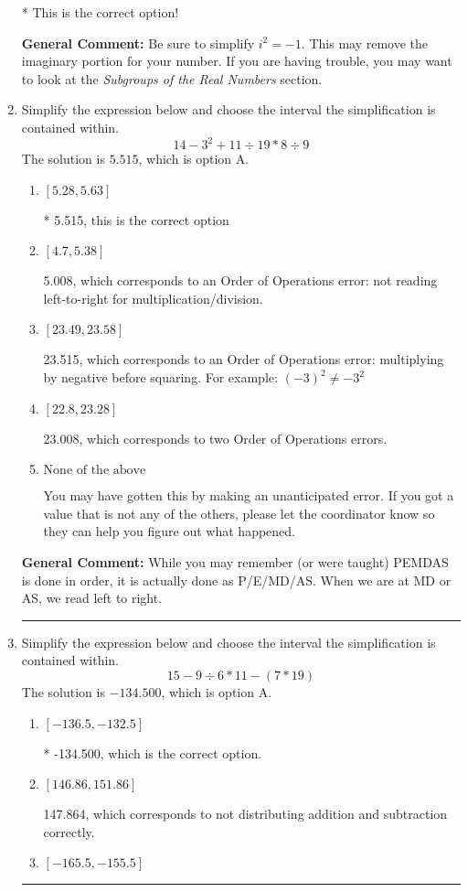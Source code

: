 \documentclass{extbook}[14pt]
\newcommand{\litem}[1]{\item #1

\rule{\textwidth}{0.4pt}}
\begin{document}
\begin{enumerate}
{\begin{enumerate}[label=\Alph*.]
* This is the correct option!
\end{enumerate}

\textbf{General Comment:} Be sure to simplify $i^2 = -1$. This may remove the imaginary portion for your number. If you are having trouble, you may want to look at the \textit{Subgroups of the Real Numbers} section.
}
\litem{
Simplify the expression below and choose the interval the simplification is contained within.
\[ 14 - 3^2 + 11 \div 19 * 8 \div 9 \]The solution is \( 5.515 \), which is option A.\begin{enumerate}[label=\Alph*.]
\item \( [5.28, 5.63] \)

* 5.515, this is the correct option
\item \( [4.7, 5.38] \)

 5.008, which corresponds to an Order of Operations error: not reading left-to-right for multiplication/division.
\item \( [23.49, 23.58] \)

 23.515, which corresponds to an Order of Operations error: multiplying by negative before squaring. For example: $(-3)^2 \neq -3^2$
\item \( [22.8, 23.28] \)

 23.008, which corresponds to two Order of Operations errors.
\item \( \text{None of the above} \)

 You may have gotten this by making an unanticipated error. If you got a value that is not any of the others, please let the coordinator know so they can help you figure out what happened.
\end{enumerate}

\textbf{General Comment:} While you may remember (or were taught) PEMDAS is done in order, it is actually done as P/E/MD/AS. When we are at MD or AS, we read left to right.
}
\litem{
Simplify the expression below and choose the interval the simplification is contained within.
\[ 15 - 9 \div 6 * 11 - (7 * 19) \]The solution is \( -134.500 \), which is option A.\begin{enumerate}[label=\Alph*.]
\item \( [-136.5, -132.5] \)

* -134.500, which is the correct option.
\item \( [146.86, 151.86] \)

 147.864, which corresponds to not distributing addition and subtraction correctly.
\item \( [-165.5, -155.5] \)


\end{enumerate}}
\end{enumerate}
\end{document}
